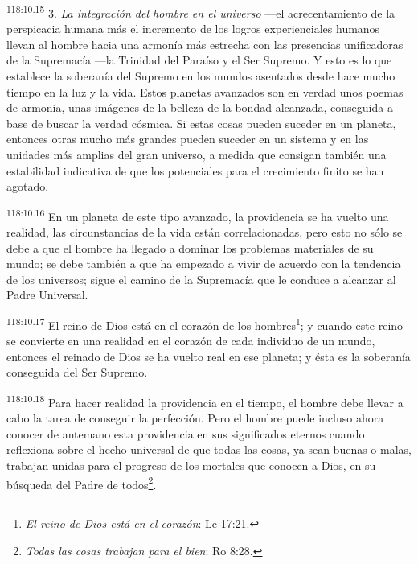 \par
\textsuperscript{118:10.15} 3. \textit{La integración del hombre en el universo} ---el acrecentamiento de la perspicacia humana más el incremento de los logros experienciales humanos llevan al hombre hacia una armonía más estrecha con las presencias unificadoras de la Supremacía ---la Trinidad del Paraíso y el Ser Supremo. Y esto es lo que establece la soberanía del Supremo en los mundos asentados desde hace mucho tiempo en la luz y la vida. Estos planetas avanzados son en verdad unos poemas de armonía, unas imágenes de la belleza de la bondad alcanzada, conseguida a base de buscar la verdad cósmica. Si estas cosas pueden suceder en un planeta, entonces otras mucho más grandes pueden suceder en un sistema y en las unidades más amplias del gran universo, a medida que consigan también una estabilidad indicativa de que los potenciales para el crecimiento finito se han agotado.

\par
\textsuperscript{118:10.16} En un planeta de este tipo avanzado, la providencia se ha vuelto una realidad, las circunstancias de la vida están correlacionadas, pero esto no sólo se debe a que el hombre ha llegado a dominar los problemas materiales de su mundo; se debe también a que ha empezado a vivir de acuerdo con la tendencia de los universos; sigue el camino de la Supremacía que le conduce a alcanzar al Padre Universal.

\par
\textsuperscript{118:10.17} El reino de Dios está en el corazón de los hombres\footnote{\textit{El reino de Dios está en el corazón}: Lc 17:21.}; y cuando este reino se convierte en una realidad en el corazón de cada individuo de un mundo, entonces el reinado de Dios se ha vuelto real en ese planeta; y ésta es la soberanía conseguida del Ser Supremo.

\par
\textsuperscript{118:10.18} Para hacer realidad la providencia en el tiempo, el hombre debe llevar a cabo la tarea de conseguir la perfección. Pero el hombre puede incluso ahora conocer de antemano esta providencia en sus significados eternos cuando reflexiona sobre el hecho universal de que todas las cosas, ya sean buenas o malas, trabajan unidas para el progreso de los mortales que conocen a Dios, en su búsqueda del Padre de todos\footnote{\textit{Todas las cosas trabajan para el bien}: Ro 8:28.}.

